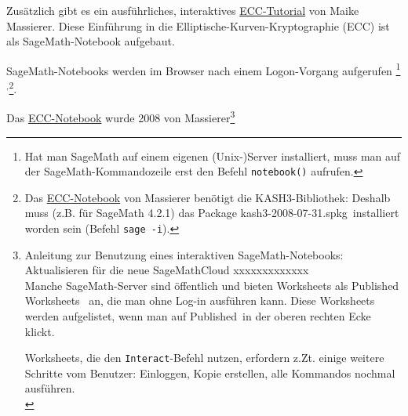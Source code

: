 \begin{refsegment}
\noindent Zusätzlich gibt es ein ausführliches, interaktives
\hyperlink{ec:Web-Link:Sage_Massierer}{ECC-Tutorial} von Maike Massierer.
Diese Einführung in die Elliptische-Kurven-Kryptographie (ECC)
ist als SageMath-Notebook aufgebaut.

\noindent SageMath-Notebooks werden im Browser nach einem Logon-Vorgang aufgerufen%
\footnote{%
Hat man SageMath auf einem eigenen (Unix-)Server installiert, muss
man auf der SageMath-Kommandozeile erst den Befehl \verb#notebook()# aufrufen.

}${}^,$\footnote{%
Das \hyperlink{ec:Web-Link:Sage_Massierer}{ECC-Notebook} von Massierer
benötigt die KASH3-Bibliothek: Deshalb muss (z.B. für SageMath 4.2.1)%
das Package \glqq kash3-2008-07-31.spkg\grqq~installiert
worden sein (Befehl \verb#sage -i#).
}.


Das \hyperlink{ec:Web-Link:Sage_Massierer}{ECC-Notebook}
wurde 2008 von Massierer\footnote{%
Anleitung zur Benutzung eines interaktiven SageMath-Notebooks:
Aktualisieren für die neue SageMathCloud xxxxxxxxxxxxx\\

  \noindent\hangindent=6pt\makebox[6pt][l]{-}%
  Manche SageMath-Server sind öffentlich
  und bieten Worksheets als
  \glqq Published Worksheets\grqq~ an, die man ohne Log-in
  ausführen kann. Diese Worksheets werden aufgelistet, wenn man
  auf \glqq Published\grqq~in der oberen rechten Ecke klickt.

  \noindent\hangindent=6pt\makebox[6pt][l]{-}%
  Worksheets, die den  \verb#Interact#-Befehl nutzen, erfordern z.Zt.
  einige weitere Schritte vom Benutzer: Einloggen, Kopie erstellen,
  alle Kommandos nochmal ausführen.\\
%


}
\end{refsegment}
